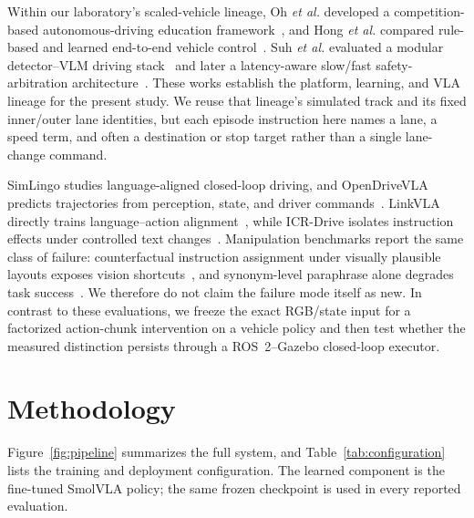 \documentclass[letterpaper,conference]{IEEEtran}
\begin{document}
Within our laboratory's scaled-vehicle lineage, Oh \emph{et al.} developed a
competition-based autonomous-driving education framework~\cite{oh2026education},
and Hong \emph{et al.} compared rule-based and learned end-to-end vehicle
control~\cite{hong2025datadriven}. Suh \emph{et al.} evaluated a modular
detector--VLM driving stack~\cite{suh2025modularvla} and later a latency-aware
slow/fast safety-arbitration architecture~\cite{suh2026lasa}. These works
establish the platform, learning, and VLA lineage for the present study. We
reuse that lineage's simulated track and its fixed inner/outer lane identities,
but each episode instruction here names a lane, a speed term, and often a
destination or stop target rather than a single lane-change command.

SimLingo studies language-aligned closed-loop driving, and OpenDriveVLA predicts
trajectories from perception, state, and driver commands~\cite{simlingo,opendrivevla}.
LinkVLA directly trains language--action alignment~\cite{linkvla}, while
ICR-Drive isolates instruction effects under controlled text
changes~\cite{icrdrive}. Manipulation benchmarks report the same class of
failure: counterfactual instruction assignment under visually plausible layouts
exposes vision shortcuts~\cite{liberocf}, and synonym-level paraphrase alone
degrades task success~\cite{liberopara}. We therefore do not claim the failure
mode itself as new. In contrast to these evaluations, we freeze the exact
RGB/state input for a factorized action-chunk intervention on a vehicle policy
and then test whether the measured distinction persists through a
ROS~2--Gazebo closed-loop executor.

\section{Methodology}
Figure~\ref{fig:pipeline} summarizes the full system, and
Table~\ref{tab:configuration} lists the training and deployment configuration.
The learned component is the fine-tuned SmolVLA policy; the same frozen
checkpoint is used in every reported evaluation.
\end{document}
